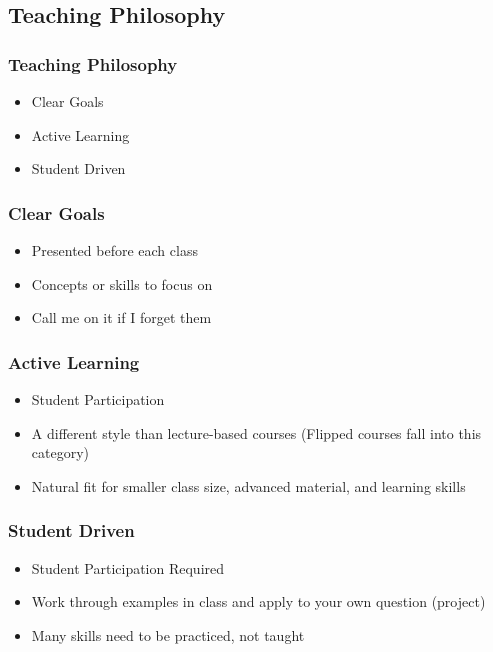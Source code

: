 \documentclass{beamer}
\begin{document}
\subsection{Teaching Philosophy}
\begin{frame}
\frametitle{Teaching Philosophy}
\begin{itemize}
	\item Clear Goals
	\item Active Learning
	\item Student Driven
\end{itemize}

\end{frame}
\begin{frame}
\frametitle{Clear Goals}
\begin{itemize}
	\item Presented before each class
	\item Concepts or skills to focus on
	\item Call me on it if I forget them
\end{itemize}
%
\end{frame}
\begin{frame}
\frametitle{Active Learning}
\begin{itemize}
	\item Student Participation
	\item A different style than lecture-based courses (Flipped courses fall into this category)
	\item Natural fit for smaller class size, advanced material, and learning skills
\end{itemize}

%
\end{frame}
\begin{frame}
\frametitle{Student Driven}
\begin{itemize}
	\item Student Participation Required
	\item Work through examples in class and apply to your own question (project)
	\item Many skills need to be practiced, not taught
\end{itemize}

%
\end{frame}
\end{document}
